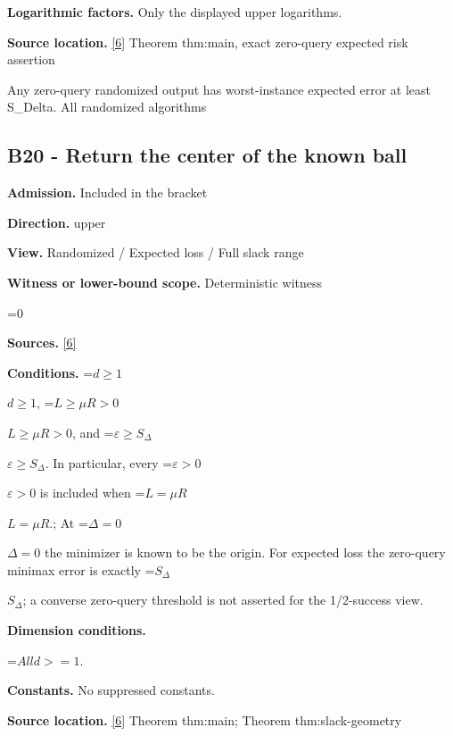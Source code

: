\documentclass[10pt,a4paper]{article}
\newcommand{\AtlasMath}[1]{\par\begingroup\centering\setbox0=\hbox{$\displaystyle #1$}\ifdim\wd0>1.4\linewidth\typeout{ATLAS WIDE FORMULA: \the\wd0}\fi\ifdim\wd0>\linewidth\resizebox{\linewidth}{!}{\box0}\else\box0\fi\par\endgroup}
\newcommand{\AtlasInlineMath}[1]{\begingroup\setbox0=\hbox{$#1$}\ifdim\wd0>.4\linewidth\endgroup\AtlasMath{#1}\else\endgroup$#1$\fi}
\begin{document}
\textbf{Logarithmic factors.} Only the displayed upper logarithms.



\textbf{Source location.} \href{https://github.com/WU-Wendao/Colombo/blob/main/colombo_sensorium/Complexity_altas/data/sources/colombo/U10/manuscript.pdf}{[6]} Theorem thm:main, exact zero-query expected risk assertion



Any zero-query randomized output has worst-instance expected error at least S\_Delta. All randomized algorithms



\subsection{B20 - Return the center of the known ball}


\textbf{Admission.} Included in the bracket



\textbf{Direction.} upper



\textbf{View.} Randomized / Expected loss / Full slack range



\textbf{Witness or lower-bound scope.} Deterministic witness



\AtlasMath{0}


\textbf{Sources.} \href{https://github.com/WU-Wendao/Colombo/blob/main/colombo_sensorium/Complexity_altas/data/sources/colombo/U10/manuscript.pdf}{[6]}



\textbf{Conditions.} \AtlasInlineMath{d\ge1}, \AtlasInlineMath{L\ge\mu R>0}, and \AtlasInlineMath{\varepsilon\ge S_\Delta}. In particular, every \AtlasInlineMath{\varepsilon>0} is included when \AtlasInlineMath{L=\mu R}.; At \AtlasInlineMath{\Delta=0} the minimizer is known to be the origin. For expected loss the zero-query minimax error is exactly \AtlasInlineMath{S_\Delta}; a converse zero-query threshold is not asserted for the 1/2-success view.



\textbf{Dimension conditions.}



\AtlasMath{All d>=1.}


\textbf{Constants.} No suppressed constants.



\textbf{Source location.} \href{https://github.com/WU-Wendao/Colombo/blob/main/colombo_sensorium/Complexity_altas/data/sources/colombo/U10/manuscript.pdf}{[6]} Theorem thm:main; Theorem thm:slack-geometry
\end{document}
